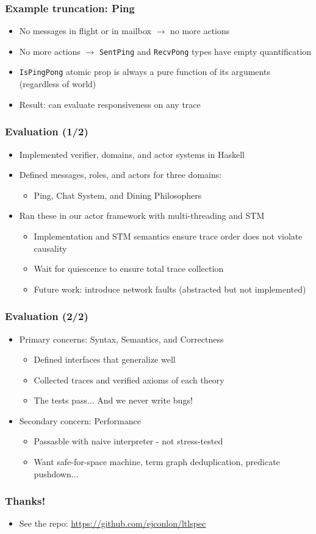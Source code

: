 \documentclass[12pt,aspectratio=169]{beamer}
\begin{document}
\begin{frame}
\frametitle{Example truncation: Ping}
\begin{itemize}
  \item No messages in flight or in mailbox $\rightarrow$ no more actions
  \item No more actions $\rightarrow$ \texttt{SentPing} and \texttt{RecvPong} types have empty quantification
  \item \texttt{IsPingPong} atomic prop is always a pure function of its arguments (regardless of world)
  \item Result: can evaluate responsiveness on any trace
\end{itemize}
\end{frame}

\begin{frame}
\frametitle{Evaluation (1/2)}
\begin{itemize}
  \item Implemented verifier, domains, and actor systems in Haskell
  \item Defined messages, roles, and actors for three domains:
  \begin{itemize}
    \item Ping, Chat System, and Dining Philosophers
  \end{itemize}
  \item Ran these in our actor framework with multi-threading and STM
  \begin{itemize}
    \item Implementation and STM semantics ensure trace order does not violate causality
    \item Wait for quiescence to ensure total trace collection
    \item Future work: introduce network faults (abstracted but not implemented)
  \end{itemize}
\end{itemize}
\end{frame}

\begin{frame}
\frametitle{Evaluation (2/2)}
\begin{itemize}
  \item Primary concerns: Syntax, Semantics, and Correctness
    \begin{itemize}
      \item Defined interfaces that generalize well
      \item Collected traces and verified axioms of each theory
      \item The tests pass... And we never write bugs!
    \end{itemize}
  \item Secondary concern: Performance
    \begin{itemize}
      \item Passasble with naive interpreter - not stress-tested
      \item Want safe-for-space machine, term graph deduplication, predicate pushdown...
    \end{itemize}
\end{itemize}
\end{frame}

\begin{frame}
\frametitle{Thanks!}
\begin{itemize}
  \item See the repo: \url{https://github.com/ejconlon/ltlspec}
\end{itemize}
\end{frame}
\end{document}
